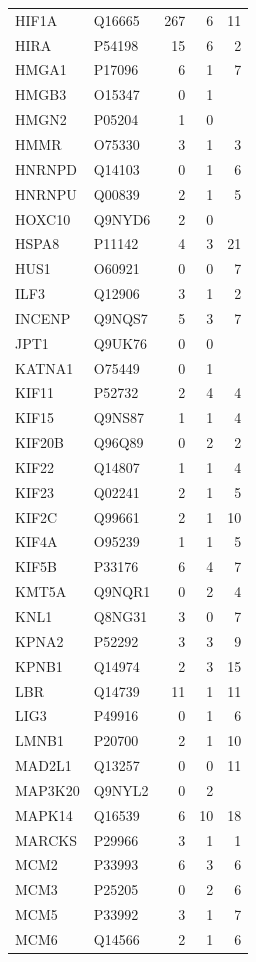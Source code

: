 \begin{longtable}{llrrr}
HIF1A & Q16665 & 267 & 6 & 11 \\
HIRA & P54198 & 15 & 6 & 2 \\
HMGA1 & P17096 & 6 & 1 & 7 \\
HMGB3 & O15347 & 0 & 1 &  \\
HMGN2 & P05204 & 1 & 0 &  \\
HMMR & O75330 & 3 & 1 & 3 \\
HNRNPD & Q14103 & 0 & 1 & 6 \\
HNRNPU & Q00839 & 2 & 1 & 5 \\
HOXC10 & Q9NYD6 & 2 & 0 &  \\
HSPA8 & P11142 & 4 & 3 & 21 \\
HUS1 & O60921 & 0 & 0 & 7 \\
ILF3 & Q12906 & 3 & 1 & 2 \\
INCENP & Q9NQS7 & 5 & 3 & 7 \\
JPT1 & Q9UK76 & 0 & 0 &  \\
KATNA1 & O75449 & 0 & 1 &  \\
KIF11 & P52732 & 2 & 4 & 4 \\
KIF15 & Q9NS87 & 1 & 1 & 4 \\
KIF20B & Q96Q89 & 0 & 2 & 2 \\
KIF22 & Q14807 & 1 & 1 & 4 \\
KIF23 & Q02241 & 2 & 1 & 5 \\
KIF2C & Q99661 & 2 & 1 & 10 \\
KIF4A & O95239 & 1 & 1 & 5 \\
KIF5B & P33176 & 6 & 4 & 7 \\
KMT5A & Q9NQR1 & 0 & 2 & 4 \\
KNL1 & Q8NG31 & 3 & 0 & 7 \\
KPNA2 & P52292 & 3 & 3 & 9 \\
KPNB1 & Q14974 & 2 & 3 & 15 \\
LBR & Q14739 & 11 & 1 & 11 \\
LIG3 & P49916 & 0 & 1 & 6 \\
LMNB1 & P20700 & 2 & 1 & 10 \\
MAD2L1 & Q13257 & 0 & 0 & 11 \\
MAP3K20 & Q9NYL2 & 0 & 2 &  \\
MAPK14 & Q16539 & 6 & 10 & 18 \\
MARCKS & P29966 & 3 & 1 & 1 \\
MCM2 & P33993 & 6 & 3 & 6 \\
MCM3 & P25205 & 0 & 2 & 6 \\
MCM5 & P33992 & 3 & 1 & 7 \\
MCM6 & Q14566 & 2 & 1 & 6 \\

\end{longtable}
